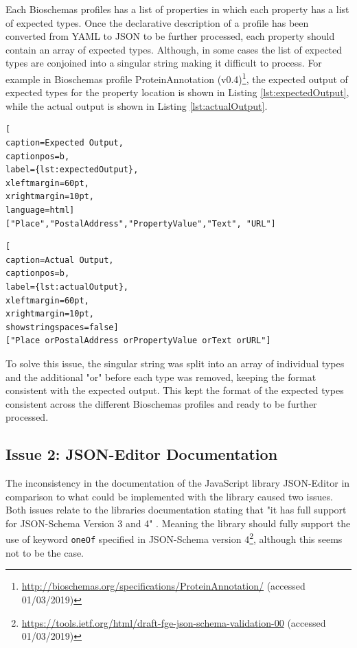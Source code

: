 Each Bioschemas profiles has a list of properties in which each property has a list of expected types. Once the declarative description of a profile has been converted from YAML to JSON to be further processed, each property should contain an array of expected types. Although, in some cases the list of expected types are conjoined into a singular string making it difficult to process. For example in Bioschemas profile ProteinAnnotation (v0.4)\footnote{\url{http://bioschemas.org/specifications/ProteinAnnotation/} (accessed 01/03/2019)}, the expected output of expected types for the property location is shown in Listing \ref{lst:expectedOutput}, while the actual output is shown in Listing \ref{lst:actualOutput}.


\newpage
{
\begin{lstlisting}[
caption=Expected Output,
captionpos=b,
label={lst:expectedOutput},
xleftmargin=60pt,
xrightmargin=10pt,
language=html]
["Place","PostalAddress","PropertyValue","Text", "URL"]
\end{lstlisting}

\begin{center}
\begin{lstlisting}[
caption=Actual Output,
captionpos=b,
label={lst:actualOutput},
xleftmargin=60pt,
xrightmargin=10pt,
showstringspaces=false]
["Place orPostalAddress orPropertyValue orText orURL"]
\end{lstlisting}  
\end{center}

To solve this issue, the singular string was split into an array of individual types and the additional "or" before each type was removed, keeping the format consistent with the expected output. This kept the format of the expected types consistent across the different Bioschemas profiles and ready to be further processed.

\subsection{Issue 2: JSON-Editor Documentation}
The inconsistency in the documentation of the JavaScript library JSON-Editor in comparison to what could be implemented with the library caused two issues. Both issues relate to the libraries documentation stating that "it has full support for JSON-Schema Version 3 and 4" \cite{jsonEditor}. Meaning the library should fully support the use of keyword \texttt{oneOf} specified in JSON-Schema version 4\footnote{\url{https://tools.ietf.org/html/draft-fge-json-schema-validation-00} (accessed 01/03/2019)}, although this seems not to be the case.

}
